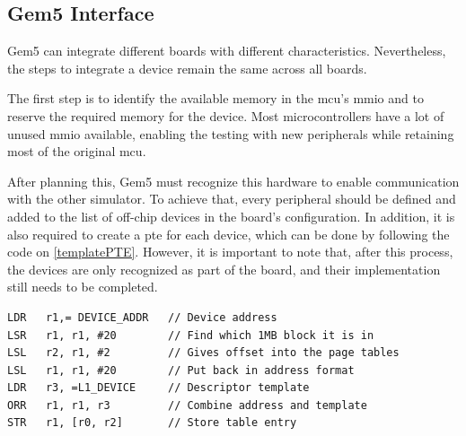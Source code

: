 \subsection{Gem5 Interface}

Gem5 can integrate different boards with different characteristics. Nevertheless, the steps to integrate a device remain the same across 
all boards. 

The first step is to identify the available memory in the \gls{mcu}'s \gls{mmio} and to reserve the required memory for the device. 
Most microcontrollers have a lot of unused \gls{mmio} available, enabling the testing with new peripherals while retaining most of the 
original \gls{mcu}.

After planning this, Gem5 must recognize this hardware to enable communication with the other simulator. 
To achieve that, every peripheral should be defined and added to the list of off-chip devices in the 
board's configuration. In addition, it is also required to create a \gls{pte} for each device, which can be done by following the
code on \ref{templatePTE}. However, it is important to note that, after this process, the devices are only recognized as part of the 
board, and their implementation still needs to be completed.

\hspace{1cm}

\begin{lstlisting}[style=customasm, caption={Template for a \gls{pte}}, label=templatePTE]
LDR   r1,= DEVICE_ADDR	 // Device address
LSR   r1, r1, #20        // Find which 1MB block it is in
LSL   r2, r1, #2         // Gives offset into the page tables
LSL   r1, r1, #20        // Put back in address format
LDR   r3, =L1_DEVICE     // Descriptor template
ORR   r1, r1, r3         // Combine address and template
STR   r1, [r0, r2]       // Store table entry
\end{lstlisting}


